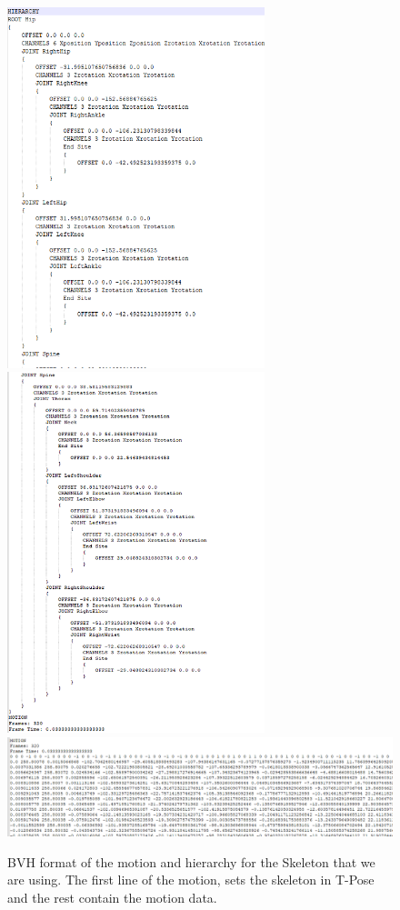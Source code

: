 \begin{figure}[htp]
    \centering
    \includegraphics[width=7.5cm]{figures/Implementation/bvh1.png}%
    \qquad
    \includegraphics[width=7.5cm]{figures/Implementation/bvh2.png}%
    \qquad
    \includegraphics[width=1\textwidth]{figures/Implementation/bvh3.png}%
    \captionsetup{labelformat=empty}
    \caption{BVH format of the motion and hierarchy for the Skeleton that we are using. The first line of the motion, sets the skeleton in T-Pose and the rest contain the motion data.}
\end{figure}

